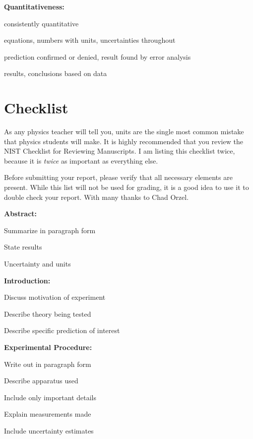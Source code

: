 \documentclass[
    10pt,aps,prl,
    amsfonts,
    amssymb,
    amsmath,
    draft,
    runinaddress,
    secnum,
    showkeys,
    superscriptaddress,
    twocolumn,
]{revtex4}
\begin{document}
    \textbf{Quantitativeness:}
    \begin{itemize*}
        \item consistently quantitative
        \item equations, numbers with units, uncertainties throughout
        \item prediction confirmed or denied, result found by error analysis
        \item results, conclusions based on data
    \end{itemize*}

\section{Checklist}
    As any physics teacher will tell you,
        units are the single most common mistake that physics students will make.
    It is highly recommended that you review the NIST Checklist for Reviewing Manuscripts\cite{NISTsp811}.
    I am listing this checklist twice,
        because it is \emph{twice} as important as everything else.

    Before submitting your report, please verify that all necessary elements are present.
    While this list will not be used for grading,
        it is a good idea to use it to double check your report.
    With many thanks to Chad Orzel\cite{Orzel}.

    \textbf{Abstract:}
    \begin{itemize*}[label=\square]
        \item Summarize in paragraph form
        \item State results
        \item Uncertainty and units
    \end{itemize*}

    \textbf{Introduction:}
    \begin{itemize*}[label=\square]
        \item Discuss motivation of experiment
        \item Describe theory being tested
        \item Describe specific prediction of interest
    \end{itemize*}

    \textbf{Experimental Procedure:}
    \begin{itemize*}[label=\square]
        \item Write out in paragraph form
        \item Describe apparatus used
        \item Include only important details
        \item Explain measurements made
        \item Include uncertainty estimates
    \end{itemize*}
\end{document}
